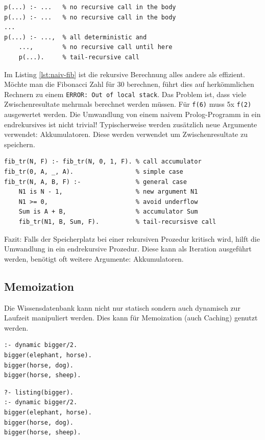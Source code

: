 \begin{lstlisting}[caption=Endrekursion: Allg. Beispiel]
p(...) :- ... 	% no recursive call in the body
p(...) :- ... 	% no recursive call in the body
...
p(...) :- ..., 	% all deterministic and
	..., 		% no recursive call until here
	p(...). 	% tail-recursive call
\end{lstlisting}

Im Listing \ref{lst:naiv-fib} ist die rekursive Berechnung alles andere als effizient. Möchte man die Fibonacci Zahl für 30 berechnen, führt dies auf herkömmlichen Rechnern zu einem \verb|ERROR: Out of local stack|. Das Problem ist, dass viele Zwischenresultate mehrmals berechnet werden müssen. Für \verb|f(6)| muss 5x \verb|f(2)| ausgewertet werden. Die Umwandlung von einem naivem Prolog-Programm in ein endrekursives ist nicht trivial! Typischerweise werden zusätzlich neue Argumente verwendet: Akkumulatoren. Diese werden verwendet um Zwischenresultate zu speichern.

\begin{lstlisting}[caption=Endrekursive Fibonnaci-Berechnung]
fib_tr(N, F) :- fib_tr(N, 0, 1, F). % call accumulator
fib_tr(0, A, _, A). 				% simple case
fib_tr(N, A, B, F) :- 				% general case
	N1 is N - 1, 					% new argument N1
	N1 >= 0, 						% avoid underflow
	Sum is A + B,					% accumulator Sum
	fib_tr(N1, B, Sum, F). 			% tail-recursisve call
\end{lstlisting}

Fazit: Falls der Speicherplatz bei einer rekursiven Prozedur kritisch wird, hilft die Umwandlung in ein endrekursive Prozedur. Diese kann als Iteration ausgeführt werden, benötigt oft weitere Argumente: Akkumulatoren.

\newpage

\subsection{Memoization}
Die Wissensdatenbank kann nicht nur statisch sondern auch dynamisch zur Laufzeit manipuliert werden. Dies kann für Memoization (auch Caching) genutzt werden.

\begin{lstlisting}[caption=dynamic/1]
% Damit Prädikate zur Laufzeit modifiziert werden können, müssen diese mit dynamic definiert werden.
:- dynamic bigger/2.
bigger(elephant, horse).
bigger(horse, dog).
bigger(horse, sheep).
\end{lstlisting}

\begin{lstlisting}[caption=listing/1]
% Mittels listing können die Fakten und Regel zu einem Prädikat angezeigt werden.
?- listing(bigger).
:- dynamic bigger/2.
bigger(elephant, horse).
bigger(horse, dog).
bigger(horse, sheep).
\end{lstlisting}

